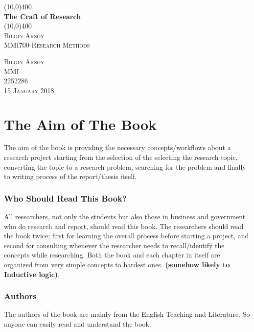 \documentclass[11pt]{article} %
\title{}
\author{}
\begin{document}
\begin{titlepage}
	\begin{center}
		\line(10,0){400}\\
		[4mm] %
		\huge{\bfseries The Craft of Research} \\
		[1mm]
		\line(10,0){400}\\
		[1 cm]
		\textsc{\LARGE Bilgin Aksoy}\\
		[1 cm]
		\textsc{\large MMI700-Research Methods}\\
		[15 cm]
	\end{center}
	
	\begin{flushright}
		\textsc{\large Bilgin Aksoy\\
		MMI\\
		2252286\\
		15 January 2018\\
		}
	\end{flushright}
\end{titlepage} 
\setcounter{page}{1}

\section{The Aim of The Book}
	\justifying The aim of the book is providing the necessary concepts/workflows about a research project starting from the selection of the selecting the research topic, converting the topic to a research problem, searching for the problem and finally to writing process of the report/thesis itself. \\
	
	\subsubsection{Who Should Read This Book?}
	All researchers, not only the students but also those in business and government who do research and report, should read this book. The researchers should read the book twice; first for learning the overall process before starting a project, and second for consulting whenever the researcher needs to recall/identify the concepts while researching. Both the book and each chapter in itself are organized from  very simple concepts to hardest ones. \textbf{(somehow likely to Inductive logic)}.\\
	
	\subsubsection{Authors}
	The authors of the book are mainly from the English Teaching and Literature. So anyone can easily read and understand the book.   \\
\end{document}
